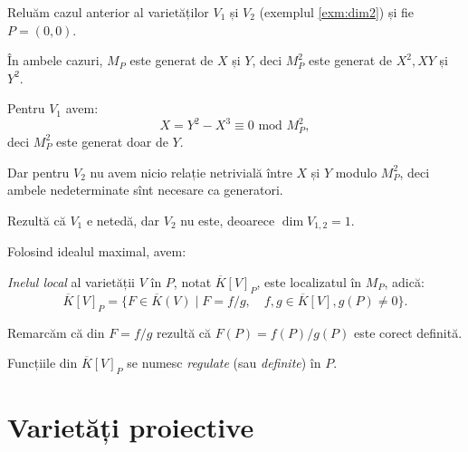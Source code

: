 \begin{example}\label{exm:nesing}
  Reluăm cazul anterior al varietăților $ V_1 $ și $ V_2 $ (exemplul \ref{exm:dim2}) și
  fie $ P = (0, 0) $.

  În ambele cazuri, $ M_P $ este generat de $ X $ și $ Y $, deci $ M_P^2 $ este generat de
  $ X^2, XY $ și $ Y^2 $.

  Pentru $ V_1 $ avem:
  \[
    X = Y^2 - X^3 \equiv 0 \text{ mod } M_P^2,
  \]
  deci $ M_P^2 $ este generat doar de $ Y $.

  Dar pentru $ V_2 $ nu avem nicio relație netrivială între $ X $ și $ Y $ modulo $ M_P^2 $, deci
  ambele nedeterminate sînt necesare ca generatori.

  Rezultă că $ V_1 $ e netedă, dar $ V_2 $ nu este, deoarece $ \dim V_{1,2} = 1 $.
\end{example}

Folosind idealul maximal, avem:
\begin{definition}\label{def:inel-local}
  \emph{Inelul local} al varietății $ V $ în $ P $, notat $ \overline{K}[V]_P $, este localizatul
  în $ M_P $, adică:
  \[
    \overline{K}[V]_P = \{ F \in \overline{K}(V) \mid F = f/g, \quad f,g \in \overline{K}[V], g(P) \neq 0 \}.
  \]
\end{definition}

Remarcăm că din $ F = f/g $ rezultă că $ F(P) = f(P)/g(P) $ este corect definită.

Funcțiile din $ \overline{K}[V]_P $ se numesc \emph{regulate} (sau \emph{definite}) în $ P $.


\section{Varietăți proiective}


